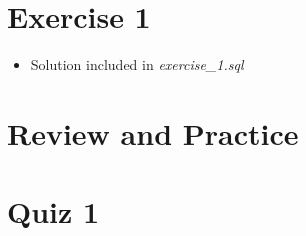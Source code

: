 \documentclass[12pt]{article}
\begin{document}
\bigskip

\section{Exercise 1}

\bigskip

\begin{itemize}
    \item Solution included in \textit{exercise\_1.sql}
\end{itemize}

\bigskip

\section{Review and Practice}


\bigskip

\section{Quiz 1}

\bigskip
\end{document}
